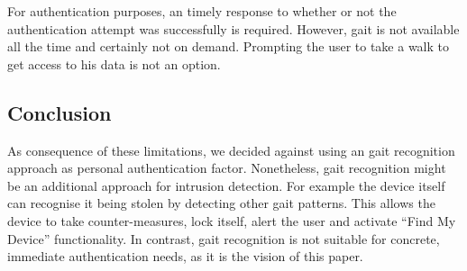 For authentication purposes, an timely response to whether or not the authentication attempt was successfully is required. However, gait is not available all the time and certainly not on demand. Prompting the user to take a walk to get access to his data is not an option.

\subsection{Conclusion}
As consequence of these limitations, we decided against using an gait recognition approach as personal authentication factor. Nonetheless, gait recognition might be an additional approach for intrusion detection. For example the device itself can recognise it being stolen by detecting other gait patterns. This allows the device to take counter-measures, \eg lock itself, alert the user and activate ``Find My Device'' functionality.
In contrast, gait recognition is not suitable for concrete, immediate authentication needs, as it is the vision of this paper.